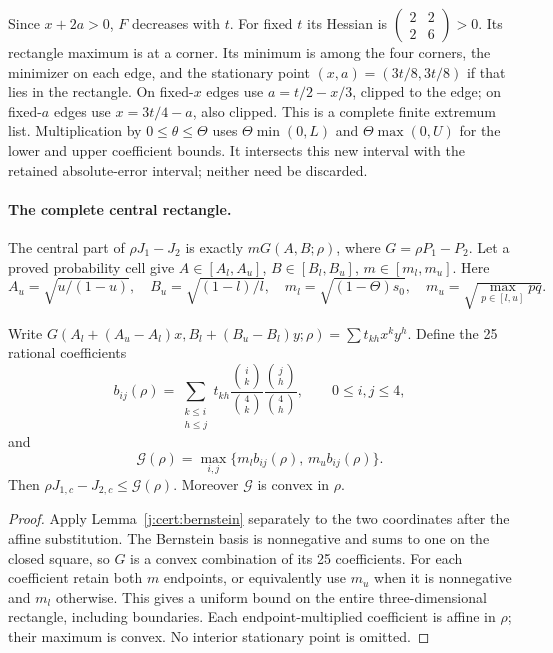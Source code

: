 Since $x+2a>0$, $F$ decreases with $t$.
For fixed $t$ its Hessian is
$\left(\begin{smallmatrix}2&2\\2&6\end{smallmatrix}\right)>0$.
Its rectangle maximum is at a corner. Its minimum is among the four
corners, the minimizer on each edge, and the stationary point
$(x,a)=(3t/8,3t/8)$ if that lies in the rectangle.
On fixed-$x$ edges use $a=t/2-x/3$, clipped to the edge; on
fixed-$a$ edges use $x=3t/4-a$, also clipped.
This is a complete finite extremum list.
Multiplication by $0\le\theta\le\Theta$ uses
$\Theta\min(0,L)$ and $\Theta\max(0,U)$ for the lower and upper
coefficient bounds. It intersects this new interval with the retained
absolute-error interval; neither need be discarded.

\paragraph{The complete central rectangle.}
The central part of $\rho J_1-J_2$ is exactly
$mG(A,B;\rho)$, where $G=\rho P_1-P_2$.
Let a proved probability cell give
$A\in[A_l,A_u]$, $B\in[B_l,B_u]$, $m\in[m_l,m_u]$.
Here
\[
 A_u=\sqrt{u/(1-u)},\quad B_u=\sqrt{(1-l)/l},\quad
 m_l=\sqrt{(1-\Theta)s_0},\quad
 m_u=\sqrt{\max_{p\in[l,u]}pq}.
\]

\begin{lemma}\label{j:local:entry201:central}
Write $G(A_l+(A_u-A_l)x,B_l+(B_u-B_l)y;\rho)
=\sum t_{kh}x^ky^h$. Define the 25 rational coefficients
\[
 b_{ij}(\rho)=\sum_{\substack{k\le i\\h\le j}}
 t_{kh}\frac{\binom{i}{k}}{\binom4k}
          \frac{\binom{j}{h}}{\binom4h},\qquad 0\le i,j\le4,
\]
and
\[
 \mathcal G(\rho)=\max_{i,j}
       \{m_l b_{ij}(\rho),\,m_u b_{ij}(\rho)\}.
\]
Then $\rho J_{1,c}-J_{2,c}\le\mathcal G(\rho)$.
Moreover $\mathcal G$ is convex in $\rho$.
\end{lemma}
\begin{proof}
Apply Lemma~\ref{j:cert:bernstein} separately to the
two coordinates after the affine substitution. The Bernstein basis is nonnegative and sums to one on the closed square,
so $G$ is a convex combination of its 25 coefficients.
For each coefficient retain both $m$ endpoints, or equivalently use
$m_u$ when it is nonnegative and $m_l$ otherwise. This gives a uniform
bound on the entire three-dimensional rectangle, including boundaries.
Each endpoint-multiplied coefficient is affine in $\rho$; their maximum
is convex. No interior stationary point is omitted.
\end{proof}



